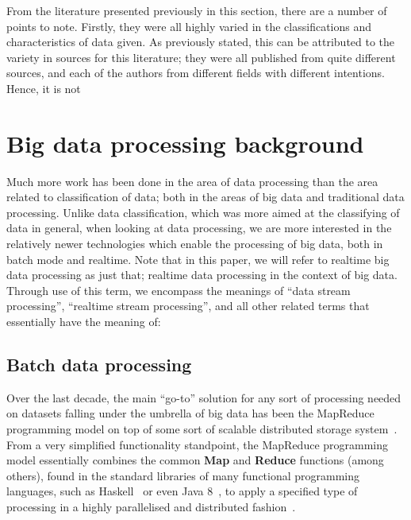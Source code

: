 \documentclass[a4paper,11pt]{article}
\begin{document}
From the literature presented previously in this section, there are a number of points to note. Firstly, they were all
highly varied in the classifications and characteristics of data given. As previously stated, this can be attributed
to the variety in sources for this literature; they were all published from quite different sources, and each of the
authors from different fields with different intentions. Hence, it is not







\section{Big data processing background} %
\label{sec:big_data_processing_background}

Much more work has been done in the area of data processing than the area related to classification of data; both in
the areas of big data and traditional data processing. Unlike data classification, which was more aimed at the classifying
of data in general, when looking at data processing, we are more interested in the relatively newer technologies which
enable the processing of big data, both in batch mode and realtime. Note that in this paper, we will refer to realtime
big data processing as just that; realtime data processing in the context of big data. Through use of this term, we encompass the meanings of
``data stream processing'', ``realtime stream processing'', and all other related terms that essentially have the meaning of:


\subsection{Batch data processing} %
\label{sub:batch_data_processing}

Over the last decade, the main ``go-to'' solution for any sort of processing needed on datasets falling under the
umbrella of big data has been the MapReduce programming model on top of some sort of scalable distributed storage
system~\cite{bifet_mining_2013}. From a very simplified functionality standpoint, the MapReduce programming model essentially
combines the common \textbf{Map} and \textbf{Reduce} functions (among others), found in the standard libraries of many functional
programming languages, such as Haskell~\cite{lammel2008google} or even Java 8~\cite{su2014changing}, to apply a specified
type of processing in a highly parallelised and distributed fashion~\cite{yang2007map}.
\end{document}
